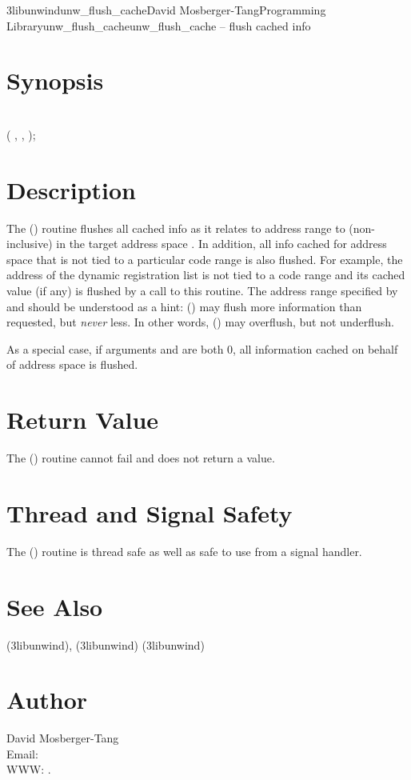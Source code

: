 \documentclass{article}
\begin{document}
\begin{Name}{3libunwind}{unw\_flush\_cache}{David Mosberger-Tang}{Programming Library}{unw\_flush\_cache}unw\_flush\_cache -- flush cached info
\end{Name}

\section{Synopsis}

\\

 ( ,  ,  );\\

\section{Description}

The () routine flushes all cached info as it
relates to address range  to  (non-inclusive) in the
target address space .  In addition, all info cached for
address space  that is not tied to a particular code range is
also flushed.  For example, the address of the dynamic registration
list is not tied to a code range and its cached value (if any) is
flushed by a call to this routine.  The address range specified by
 and  should be understood as a hint:
() may flush more information than requested,
but \emph{never} less.  In other words, () may
overflush, but not underflush.

As a special case, if arguments  and  are both 0, all
information cached on behalf of address space  is flushed.

\section{Return Value}

The () routine cannot fail and does not
return a value.

\section{Thread and Signal Safety}

The () routine is thread safe as well as safe to
use from a signal handler.

\section{See Also}

(3libunwind),
(3libunwind)
(3libunwind)

\section{Author}

\noindent
David Mosberger-Tang\\
Email: \\
WWW: .
\LatexManEnd
\end{document}
